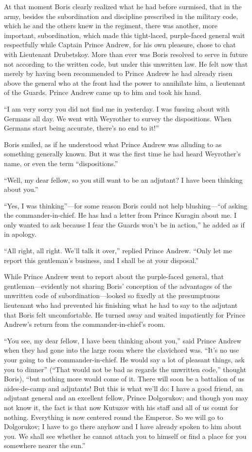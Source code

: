 At that moment Boris clearly realized what he had before
surmised, that in the army, besides the subordination and
discipline prescribed in the military code, which he and the
others knew in the regiment, there was another, more important,
subordination, which made this tight-laced, purple-faced general
wait respectfully while Captain Prince Andrew, for his own
pleasure, chose to chat with Lieutenant Drubetskoy. More than
ever was Boris resolved to serve in future not according to the
written code, but under this unwritten law. He felt now that
merely by having been recommended to Prince Andrew he had already
risen above the general who at the front had the power to
annihilate him, a lieutenant of the Guards. Prince Andrew came up
to him and took his hand.

``I am very sorry you did not find me in yesterday. I was fussing
about with Germans all day. We went with Weyrother to survey the
dispositions.  When Germans start being accurate, there's no end
to it!''

Boris smiled, as if he understood what Prince Andrew was alluding
to as something generally known. But it was the first time he had
heard Weyrother's name, or even the term ``dispositions.''

``Well, my dear fellow, so you still want to be an adjutant? I
have been thinking about you.''

``Yes, I was thinking''---for some reason Boris could not help
blushing---``of asking the commander-in-chief. He has had a
letter from Prince Kuragin about me. I only wanted to ask because
I fear the Guards won't be in action,'' he added as if in
apology.

``All right, all right. We'll talk it over,'' replied Prince
Andrew. ``Only let me report this gentleman's business, and I
shall be at your disposal.''

While Prince Andrew went to report about the purple-faced
general, that gentleman---evidently not sharing Boris' conception
of the advantages of the unwritten code of subordination---looked
so fixedly at the presumptuous lieutenant who had prevented his
finishing what he had to say to the adjutant that Boris felt
uncomfortable. He turned away and waited impatiently for Prince
Andrew's return from the commander-in-chief's room.

``You see, my dear fellow, I have been thinking about you,'' said
Prince Andrew when they had gone into the large room where the
clavichord was.  ``It's no use your going to the
commander-in-chief. He would say a lot of pleasant things, ask
you to dinner'' (``That would not be bad as regards the unwritten
code,'' thought Boris), ``but nothing more would come of it.
There will soon be a battalion of us aides-de-camp and adjutants!
But this is what we'll do: I have a good friend, an adjutant
general and an excellent fellow, Prince Dolgorukov; and though
you may not know it, the fact is that now Kutuzov with his staff
and all of us count for nothing.  Everything is now centered
round the Emperor. So we will go to Dolgorukov; I have to go
there anyhow and I have already spoken to him about you. We shall
see whether he cannot attach you to himself or find a place for
you somewhere nearer the sun.''

